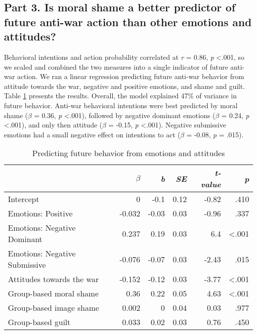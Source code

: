 \documentclass[
]{article}
\begin{document}
\hypertarget{part-3.-is-moral-shame-a-better-predictor-of-future-anti-war-action-than-other-emotions-and-attitudes}{%
\subsection*{Part 3. Is moral shame a better predictor of future anti-war action than other emotions and attitudes?}\label{part-3.-is-moral-shame-a-better-predictor-of-future-anti-war-action-than-other-emotions-and-attitudes}}

Behavioral intentions and action probability correlated at \emph{r} = 0.86, \emph{p} \textless.001, so we scaled and combined the two measures into a single indicator of future anti-war action. We ran a linear regression predicting future anti-war behavior from attitude towards the war, negative and positive emotions, and shame and guilt. Table \ref{tab:Table3} presents the results. Overall, the model explained 47\% of variance in future behavior. Anti-war behavioral intentions were best predicted by moral shame (\(\beta\) = 0.36, \emph{p} \textless.001), followed by negative dominant emotions (\(\beta\) = 0.24, \emph{p} \textless.001), and only then attitude (\(\beta\) = -0.15, \emph{p} \textless.001). Negative submissive emotions had a small negative effect on intentions to act (\(\beta\) = -0.08, \emph{p} = .015).

\begin{table}[H]

\caption{\label{tab:Table3}Predicting future behavior from emotions and attitudes
}
\centering
\fontsize{8}{10}\selectfont
\begin{tabular}[t]{lrrrrr}
\toprule
\em{ } & \em{$\beta$} & \em{b} & \em{SE} & \em{t-value} & \em{p}\\
\midrule
Intercept & 0 & -0.1 & 0.12 & -0.82 & .410\\
Emotions: Positive & -0.032 & -0.03 & 0.03 & -0.96 & .337\\
Emotions: Negative Dominant & 0.237 & 0.19 & 0.03 & 6.4 & <.001\\
Emotions: Negative Submissive & -0.076 & -0.07 & 0.03 & -2.43 & .015\\
Attitudes towards the war & -0.152 & -0.12 & 0.03 & -3.77 & <.001\\
\addlinespace
Group-based moral shame & 0.36 & 0.22 & 0.05 & 4.63 & <.001\\
Group-based image shame & 0.002 & 0 & 0.04 & 0.03 & .977\\
Group-based guilt & 0.033 & 0.02 & 0.03 & 0.76 & .450\\
\bottomrule
\end{tabular}
\end{table}
\end{document}
